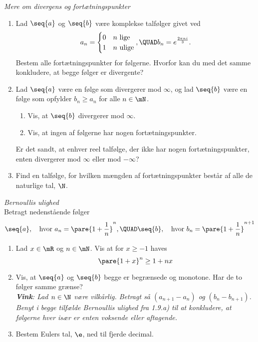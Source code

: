 \begin{opg} \emph{Mere om divergens og fortætningspunkter}
\begin{enumerate}
    \item Lad $\seq{a}$ og $\seq{b}$ være komplekse talfølger givet ved
    $$ a_n = \begin{cases} 0 & n\text{ lige} \\
            1 & n\text{ ulige} \end{cases}, \QUAD
        b_n=e^{\frac{2\pi n i}{3}}. $$
    Bestem alle fortætningspunkter for følgerne. Hvorfor kan du med det samme konkludere, at begge følger er divergente?
    
    
    \item Lad $\seq{a}$ være en følge som divergerer mod $\infty$, og lad $\seq{b}$ være en følge som opfylder $b_n\geq a_n$ for alle $n\in\mN$. 

    \begin{enumerate}[label=\roman*)]
	\item Vis, at $\seq{b}$ divergerer mod $\infty$.
	\item Vis, at ingen af følgerne har nogen fortætningspunkter.
	\end{enumerate}
    Er det sandt, at enhver reel talfølge, der ikke har nogen fortætningspunkter, enten divergerer mod $\infty$ eller mod $-\infty$?
    
     \item Find en talfølge, for hvilken m\ae{}ngden af  fortætningspunkter består af alle de naturlige tal, $ \N $.
   
\end{enumerate}
\end{opg}

\begin{opg} \emph{Bernoullis ulighed}\\
Betragt nedenstående følger
$$ \seq{a}, \quad\text{hvor } a_n = \pare{1+\frac{1}{n}}^n, \QUAD
    \seq{b}, \quad\text{hvor } b_n = \pare{1+\frac{1}{n}}^{n+1} $$
\begin{enumerate}
    \item  Lad $x\in\mR$ og $n\in\mN$. Vis at for $x\geq -1$ haves
    $$ \pare{1+x}^n \geq 1+nx $$
    \item Vis, at $\seq{a}$ og $\seq{b}$ begge er begrænsede og monotone. Har de to følger samme grænse?\vspace{0.1cm}\\
    \emph{\textbf{Vink}: Lad $ n\in\N $ være vilkårlig. Betragt så $ (a_{n+1}-a_n) $ og $ (b_n-b_{n+1}) $. Benyt i begge tilfælde Bernoullis ulighed fra 1.9.a) til at konkludere, at følgerne hver især er enten voksende eller aftagende.}
    \item Bestem Eulers tal, $ \e $, ned til fjerde decimal.
\end{enumerate}
\end{opg}